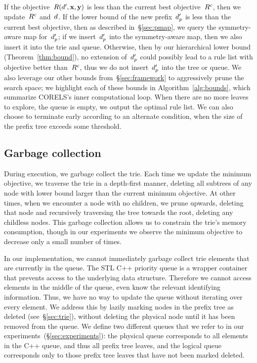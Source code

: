 If the objective~$R({d}', \mathbf{x}, \mathbf{y})$ is less than the current best objective~${R^c}$,
then we update~${R^c}$ and~${d}$.
%
If the lower bound of the new prefix~$d_p'$ is less than the current best objective,
then as described in~\S\ref{sec:pmap}, we query the symmetry-aware map for~$d_p'$;
if we insert~$d_p'$ into the symmetry-aware map, then we also insert it into the trie and queue.
%
Otherwise, %
then by our hierarchical lower bound (Theorem~\ref{thm:bound}),
no extension of~$d_p'$ could possibly lead to a rule list with objective
better than~${R^c}$, thus we do not insert~$d_p'$ into the tree or queue.
%
We also leverage our other bounds from~\S\ref{sec:framework}
to aggressively prune the search space; we highlight each of these bounds
in Algorithm~\ref{alg:bounds}, which summarize CORELS's inner computational loop.
%
When there are no more leaves to explore, \ie the queue is empty, we output the optimal rule list.
%
We can also choose to terminate early according to an alternate condition,
\eg when the size of the prefix tree exceeds some threshold.

\subsection{Garbage collection}
\label{sec:gc}

During execution, we garbage collect the trie.
%
Each time we update the minimum objective,
we traverse the trie in a depth-first manner, deleting all subtrees
of any node with lower bound larger than the current minimum objective.
%
At other times, when we encounter a node with no children, we prune upwards,
deleting that node and recursively traversing the tree towards the root,
deleting any childless nodes.
%
This garbage collection allows us to constrain the trie's memory consumption, though in our
experiments we observe the minimum objective to decrease only a small number of times.

In our implementation, we cannot immediately garbage collect trie elements that are currently in the queue.
%
The STL C++ priority queue is a wrapper container that prevents access to the underlying data structure.
%
Therefore we cannot access elements in the middle of the queue,
even know the relevant identifying information.
%
Thus, we have no way to update the queue without iterating over every element.
%
We address this by lazily marking nodes in the prefix tree as deleted (see~\S\ref{sec:trie}),
without deleting the physical node until it has been removed from the queue.
%
We define two different queues that we refer to in our experiments~(\S\ref{sec:experiments}):
the physical queue corresponds to all elements in the C++ queue, and thus all prefix tree leaves,
and the logical queue corresponds only to those prefix tree leaves that have not been marked deleted.

